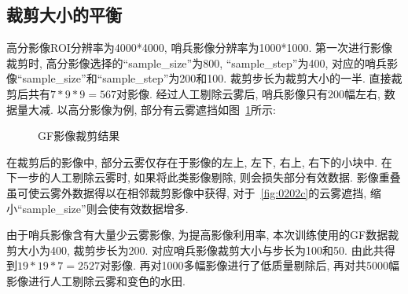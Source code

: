 \subsection{裁剪大小的平衡}
高分影像ROI分辨率为4000*4000, 哨兵影像分辨率为1000*1000. 第一次进行影像裁剪时, 高分影像选择的``sample\_size''为800, ``sample\_step''为400, 对应的哨兵影像``sample\_size''和``sample\_step''为200和100. 裁剪步长为裁剪大小的一半. 直接裁剪后共有$7*9*9=567$对影像. 经过人工剔除云雾后, 哨兵影像只有200幅左右, 数据量大减.
以高分影像为例, 部分有云雾遮挡如图~\ref{fig:0202}所示:

\begin{figure}[!htbp]
    \centering
    \quad
    \quad
    \caption{GF影像裁剪结果}
    \label{fig:0202}
\end{figure}

在裁剪后的影像中, 部分云雾仅存在于影像的左上, 左下, 右上, 右下的小块中. 在下一步的人工剔除云雾时, 如果将此类影像剔除, 则会损失部分有效数据. 影像重叠虽可使云雾外数据得以在相邻裁剪影像中获得, 对于~\ref{fig:0202c}的云雾遮挡, 缩小``sample\_size''则会使有效数据增多. 

由于哨兵影像含有大量少云雾影像, 为提高影像利用率, 本次训练使用的GF数据裁剪大小为400, 裁剪步长为200. 对应哨兵影像裁剪大小与步长为100和50. 由此共得到$19*19*7=2527$对影像. 再对1000多幅影像进行了低质量剔除后, 再对共5000幅影像进行人工剔除云雾和变色的水田.  

